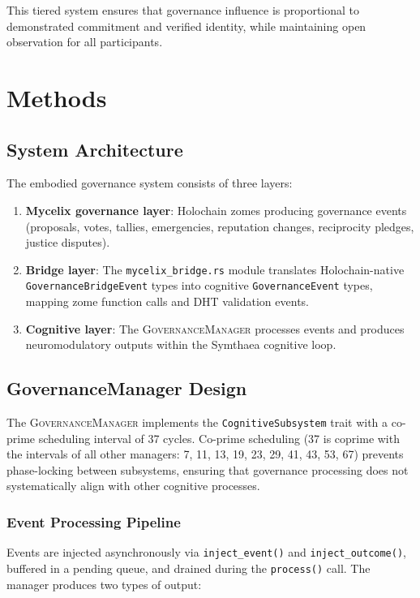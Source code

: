 \documentclass[11pt,a4paper]{article}
\begin{document}
This tiered system ensures that governance influence is proportional to demonstrated commitment and verified identity, while maintaining open observation for all participants.

\section{Methods}
\label{sec:methods}

\subsection{System Architecture}

The embodied governance system consists of three layers:

\begin{enumerate}
  \item \textbf{Mycelix governance layer}: Holochain zomes producing governance events (proposals, votes, tallies, emergencies, reputation changes, reciprocity pledges, justice disputes).
  \item \textbf{Bridge layer}: The \texttt{mycelix\_bridge.rs} module translates Holochain-native \texttt{GovernanceBridgeEvent} types into cognitive \texttt{GovernanceEvent} types, mapping zome function calls and DHT validation events.
  \item \textbf{Cognitive layer}: The \textsc{GovernanceManager} processes events and produces neuromodulatory outputs within the Symthaea cognitive loop.
\end{enumerate}

\subsection{GovernanceManager Design}

The \textsc{GovernanceManager} implements the \texttt{CognitiveSubsystem} trait with a co-prime scheduling interval of 37 cycles.
Co-prime scheduling (37 is coprime with the intervals of all other managers: 7, 11, 13, 19, 23, 29, 41, 43, 53, 67) prevents phase-locking between subsystems, ensuring that governance processing does not systematically align with other cognitive processes.

\subsubsection{Event Processing Pipeline}

Events are injected asynchronously via \texttt{inject\_event()} and \texttt{inject\_outcome()}, buffered in a pending queue, and drained during the \texttt{process()} call.
The manager produces two types of output:
\end{document}
